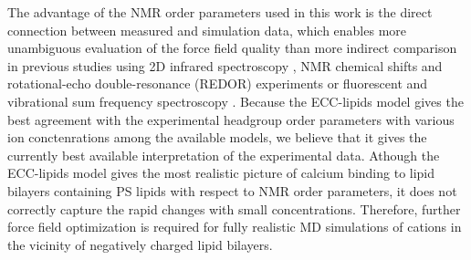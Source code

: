\documentclass[journal=jpcbfk,manuscript=article]{achemso}
\begin{document}

The advantage of the NMR order parameters used in this work is the direct connection between
measured and simulation data, which enables more unambiguous evaluation of the force field quality \cite{catte16,ollila16}
than more indirect comparison in previous studies using 2D infrared spectroscopy \cite{valentine18}, NMR chemical shifts and
rotational-echo double-resonance (REDOR) experiments \cite{hallock18} or fluorescent and vibrational sum frequency spectroscopy \cite{melcrova16}.
Because the ECC-lipids model gives the best agreement with the experimental headgroup order parameters
with various ion conctenrations among the available models, we believe that it gives the currently best available
interpretation of the experimental data. Athough the ECC-lipids model gives the most realistic picture of calcium binding to
lipid bilayers containing PS lipids with respect to NMR order parameters, it does not
correctly capture the rapid changes with small concentrations. Therefore, further
force field optimization is required for fully realistic MD simulations of cations
in the vicinity of negatively charged lipid bilayers.




%
%
% 
\end{document}
